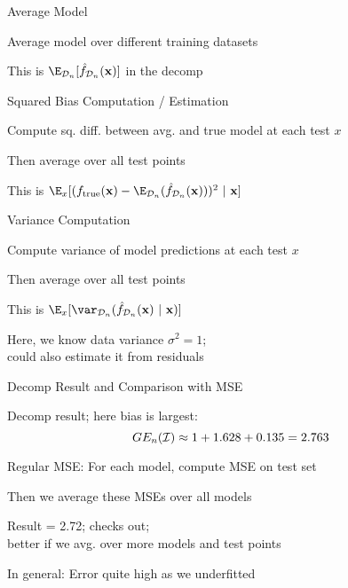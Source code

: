 \documentclass[11pt,compress,t,notes=noshow, xcolor=table]{beamer}
\begin{document}
\begin{framei}[sep=L]{Average Model}

\item Average model over different training datasets
\item This is $\E_{\D_n}[\fh_{\D_n}(\xv)]$ in the decomp


\end{framei} 


\begin{framei}[sep=M]{Squared Bias Computation / Estimation}

\item Compute sq. diff. between avg. and true model at each test $x$
\item Then average over all test points
\item This is 
$ 
\E_x[ ( \ftrue(\xv)-\E_{\D_n} (\fh_{\D_n}(\xv) ))^2~|~\xv ]
$




\end{framei} 


\begin{framei}[sep=M]{Variance Computation}

\item Compute variance of model predictions at each test $x$
\item Then average over all test points
\item This is 
$
\E_{x} [\var_{\D_n} (\fh_{\D_n}(\xv) ~|~\xv ) ]
$


\item Here, we know data variance $\sigma^2=1$;\\
could also estimate it from residuals

\end{framei} 


\begin{framei}[fs=footnotesize,sep=M]{Decomp Result and Comparison with MSE}

\item Decomp result; here bias is largest:
$$GE_n(\mathcal{I}) \approx 1 + 1.628 + 0.135 = 2.763 $$


\item Regular MSE: For each model, compute MSE on test set
\item Then we average these MSEs over all models
\item Result = 2.72; checks out; \\
better if we avg. over more models and test points 
\item In general: Error quite high as we underfitted

\end{framei}
\end{document}
